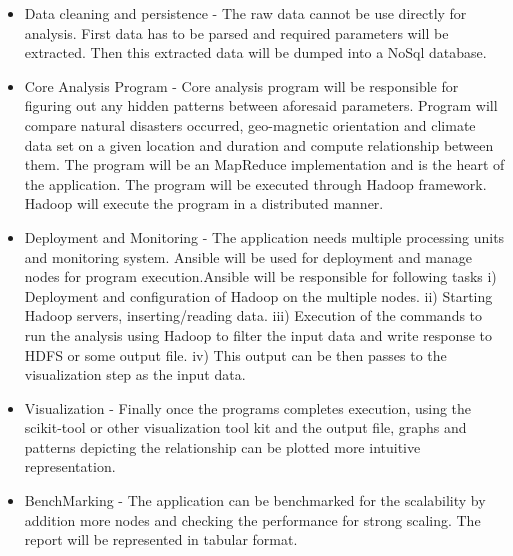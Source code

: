 \documentclass[9pt,twocolumn,twoside]{styles/osajnl}
\begin{document}
\begin{itemize}
\item Data cleaning and persistence - The raw data cannot be use directly for analysis. First data has to be parsed and required parameters will be extracted. Then this extracted data will be dumped into a NoSql database.
\item Core Analysis Program - Core analysis program will be responsible for figuring out any hidden patterns between aforesaid parameters. Program will compare natural disasters occurred, geo-magnetic orientation and climate data
set on a given location and duration and compute relationship between them. The program will be an
MapReduce implementation and is the heart of the application. The program will be executed through
Hadoop framework. Hadoop will execute the program in a distributed manner.
\item Deployment and Monitoring - The application needs multiple processing units and monitoring system. Ansible will be used for deployment and manage nodes for program execution.Ansible will be responsible for following tasks
i)   Deployment and configuration of Hadoop on the multiple nodes.
ii)  Starting Hadoop servers, inserting/reading data.
iii) Execution of the commands to run the analysis using Hadoop to filter the input data and write
response to HDFS or some output file.
iv)  This output can be then passes to the visualization step as the input data.
\item Visualization - Finally once the programs completes execution, using the scikit-tool or other visualization tool
kit and the output file, graphs and patterns depicting the relationship can be plotted more intuitive representation.
\item BenchMarking - The application can be benchmarked for the scalability by addition more nodes and checking the
performance for strong scaling. The report will be represented in tabular format.
\end{itemize}




 
\end{document}
